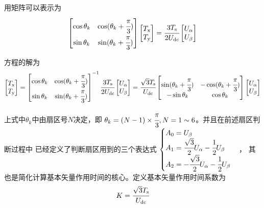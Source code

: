 用矩阵可以表示为
\begin{equation*}
    \begin{bmatrix}
        \cos\theta_k&\cos(\theta_k+\cfrac{\pi}{3})\\
        \sin\theta_k&\sin(\theta_k+\cfrac{\pi}{3})
    \end{bmatrix}
    \begin{bmatrix}T_{\mathrm{x}}\\T_{\mathrm{y}}\end{bmatrix}
    =\cfrac{3T_{\mathrm{s}}}{2U_{\mathrm{dc}}}
    \begin{bmatrix}U_{\mathrm{\alpha}}\\U_{\mathrm{\beta}}\end{bmatrix}
\end{equation*}

方程的解为
\begin{equation*}
    \begin{bmatrix}T_{\mathrm{x}}\\T_{\mathrm{y}}\end{bmatrix}
    =
    \begin{bmatrix}
        \cos\theta_k&\cos(\theta_k+\cfrac{\pi}{3})\\
        \sin\theta_k&\sin(\theta_k+\cfrac{\pi}{3})
    \end{bmatrix}^{-1}
    \cfrac{3T_{\mathrm{s}}}{2U_{\mathrm{dc}}}
    \begin{bmatrix}U_{\mathrm{\alpha}}\\U_{\mathrm{\beta}}\end{bmatrix}
    =
    \cfrac{\sqrt 3T_{\mathrm{s}}}{U_{\mathrm{dc}}}
    \begin{bmatrix}
        \sin(\theta_k+\cfrac{\pi}{3})
        &-\cos(\theta_k+\cfrac{\pi}{3})\\
        -\sin\theta_k&\cos\theta_k
    \end{bmatrix}
    \begin{bmatrix}U_{\mathrm{\alpha}}\\U_{\mathrm{\beta}}\end{bmatrix}
\end{equation*}

上式中\(\theta_k\)中由扇区号\(N\)决定，即
\(\theta_k=(N-1)\times\cfrac{\pi}{3},N=1\sim6\)。并且在前述扇区判断过程中
已经定义了判断扇区用到的三个表达式 
\(\begin{cases}A_0=U_{\mathrm{\beta}}
    \\A_1=\cfrac{\sqrt{3}}2U_{\mathrm{\alpha}}-\cfrac{1}{2}U_{\mathrm{\beta}}
    \\A_2=-\cfrac{\sqrt{3}}2U_{\mathrm{\alpha}}-\cfrac 12U_{\mathrm{\beta}}
\end{cases}\)，
其也是简化计算基本矢量作用时间的核心。定义基本矢量作用时间系数为
\begin{equation*}
    K=\cfrac{\sqrt 3T_{\mathrm{s}}}{U_{\mathrm{dc}}}
\end{equation*}

